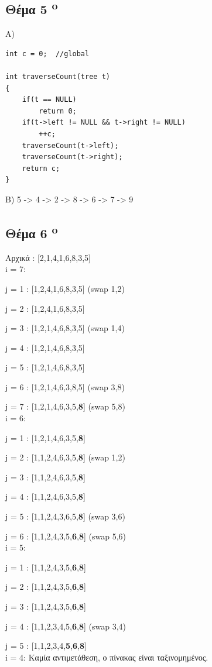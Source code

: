\documentclass[a4paper,10pt]{article}
\begin{document}
\subsection{Θέμα 5 \textsuperscript{o}}
A)\\
\begin{verbatim}
int c = 0;  //global

int traverseCount(tree t)
{
    if(t == NULL)
        return 0;
    if(t->left != NULL && t->right != NULL)
        ++c;
    traverseCount(t->left);
    traverseCount(t->right);
    return c;
}
\end{verbatim}

B)
5 -> 4 -> 2 -> 8 -> 6 -> 7 -> 9

\subsection{Θέμα 6 \textsuperscript{o}}
Αρχικά : [2,1,4,1,6,8,3,5]\\
i = 7:

j = 1 : [1,2,4,1,6,8,3,5] (swap 1,2)

j = 2 : [1,2,4,1,6,8,3,5]

j = 3 : [1,2,1,4,6,8,3,5] (swap 1,4)

j = 4 : [1,2,1,4,6,8,3,5]

j = 5 : [1,2,1,4,6,8,3,5]

j = 6 : [1,2,1,4,6,3,8,5] (swap 3,8)

j = 7 : [1,2,1,4,6,3,5,\textbf{8}] (swap 5,8)
\\
i = 6:

j = 1 : [1,2,1,4,6,3,5,\textbf{8}]

j = 2 : [1,1,2,4,6,3,5,\textbf{8}] (swap 1,2)

j = 3 : [1,1,2,4,6,3,5,\textbf{8}]

j = 4 : [1,1,2,4,6,3,5,\textbf{8}]

j = 5 : [1,1,2,4,3,6,5,\textbf{8}] (swap 3,6)

j = 6 : [1,1,2,4,3,5,\textbf{6},\textbf{8}] (swap 5,6)
\\
i = 5:

j = 1 : [1,1,2,4,3,5,\textbf{6},\textbf{8}]

j = 2 : [1,1,2,4,3,5,\textbf{6},\textbf{8}]

j = 3 : [1,1,2,4,3,5,\textbf{6},\textbf{8}]

j = 4 : [1,1,2,3,4,5,\textbf{6},\textbf{8}] (swap 3,4)

j = 5 : [1,1,2,3,4,\textbf{5},\textbf{6},\textbf{8}]
\\
i = 4: Καμία αντιμετάθεση, ο πίνακας είναι ταξινομημένος.
\end{document}
